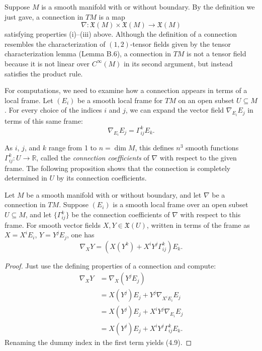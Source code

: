 Suppose $M$ is a smooth manifold with or without boundary. By the definition we just gave, a connection in $TM$ is a map
\[
\nabla: \mathfrak{X}(M) \times \mathfrak{X}(M) \to \mathfrak{X}(M)
\]
satisfying properties (i)--(iii) above. Although the definition of a connection resembles the characterization of $(1,2)$-tensor fields given by the tensor characterization lemma (Lemma B.6), a connection in $TM$ is not a tensor field because it is not linear over $C^\infty(M)$ in its second argument, but instead satisfies the product rule.

For computations, we need to examine how a connection appears in terms of a local frame. Let $(E_i)$ be a smooth local frame for $TM$ on an open subset $U \subseteq M$. For every choice of the indices $i$ and $j$, we can expand the vector field $\nabla_{E_i} E_j$ in terms of this same frame:
\begin{equation}
\nabla_{E_i} E_j = \Gamma^k_{ij} E_k. \tag{4.8}
\end{equation}

As $i$, $j$, and $k$ range from 1 to $n = \dim M$, this defines $n^3$ smooth functions $\Gamma^k_{ij}: U \to \mathbb{R}$, called the \emph{connection coefficients} of $\nabla$ with respect to the given frame. The following proposition shows that the connection is completely determined in $U$ by its connection coefficients.

\begin{proposition}
\label{prop:connection-coefficients-frame}
\leanok
Let $M$ be a smooth manifold with or without boundary, and let $\nabla$ be a connection in $TM$. Suppose $(E_i)$ is a smooth local frame over an open subset $U \subseteq M$, and let $\{\Gamma^k_{ij}\}$ be the connection coefficients of $\nabla$ with respect to this frame. For smooth vector fields $X,Y \in \mathfrak{X}(U)$, written in terms of the frame as $X = X^i E_i$, $Y = Y^j E_j$, one has
\begin{equation}
\nabla_X Y = \left(X(Y^k) + X^i Y^j \Gamma^k_{ij}\right) E_k. \tag{4.9}
\end{equation}
\end{proposition}

\begin{proof}
Just use the defining properties of a connection and compute:
\begin{align*}
\nabla_X Y &= \nabla_X (Y^j E_j) \\
&= X(Y^j) E_j + Y^j \nabla_{X^i E_i} E_j \\
&= X(Y^j) E_j + X^i Y^j \nabla_{E_i} E_j \\
&= X(Y^j) E_j + X^i Y^j \Gamma^k_{ij} E_k.
\end{align*}
Renaming the dummy index in the first term yields (4.9).
\end{proof}

